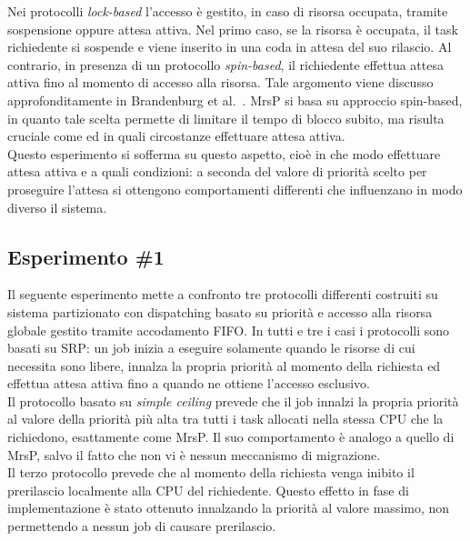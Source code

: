Nei protocolli \textit{lock-based} l'accesso è gestito, in caso di risorsa occupata, tramite sospensione oppure attesa attiva. Nel primo caso, se la risorsa è occupata, il task richiedente si sospende e viene inserito in una coda in attesa del suo rilascio. Al contrario, in presenza di un protocollo \textit{spin-based}, il richiedente effettua attesa attiva fino al momento di accesso alla risorsa. Tale argomento viene discusso approfonditamente in Brandenburg et al.~\cite{Brandenburg:2008:RSM:1440456.1440601}. MrsP si basa su approccio spin-based, in quanto tale scelta permette di limitare il tempo di blocco subito, ma risulta cruciale come ed in quali circostanze effettuare attesa attiva.\\

Questo esperimento si sofferma su questo aspetto, cioè in che modo effettuare attesa attiva e a quali condizioni: a seconda del valore di priorità scelto per proseguire l'attesa si ottengono comportamenti differenti che influenzano in modo diverso il sistema.\\

\subsection{Esperimento \#1}
\label{sec:confronto_protocolli_exp}

Il seguente esperimento mette a confronto tre protocolli differenti costruiti su sistema partizionato con dispatching basato su priorità e accesso alla risorsa globale gestito tramite accodamento FIFO. In tutti e tre i casi i protocolli sono basati su SRP: un job inizia a eseguire solamente quando le risorse di cui necessita sono libere, innalza la propria priorità al momento della richiesta ed effettua attesa attiva fino a quando ne ottiene l'accesso esclusivo.\\

Il protocollo basato su \textit{simple ceiling} prevede che il job innalzi la propria priorità al valore della priorità più alta tra tutti i task allocati nella stessa CPU che la richiedono, esattamente come MrsP. Il suo comportamento è analogo a quello di MrsP, salvo il fatto che non vi è nessun meccanismo di migrazione.\\

Il terzo protocollo prevede che al momento della richiesta venga inibito il prerilascio localmente alla CPU del richiedente. Questo effetto in fase di implementazione è stato ottenuto innalzando la priorità al valore massimo, non permettendo a nessun job di causare prerilascio.\\

